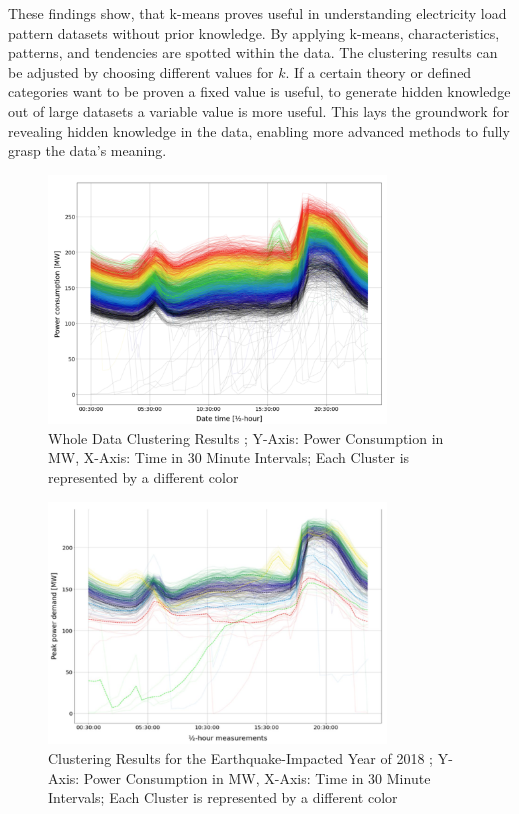 These findings show, that k-means proves useful in understanding electricity load pattern datasets without prior knowledge.
By applying k-means, characteristics, patterns, and tendencies are spotted within the data.
The clustering results can be adjusted by choosing different values for $k$.
If a certain theory or defined categories want to be proven a fixed value is useful, to generate hidden knowledge out of large datasets a variable value is more useful.
This lays the groundwork for revealing hidden knowledge in the data, enabling more advanced methods to fully grasp the data's meaning.

\begin{figure}[H]
    \centering
    \includegraphics[width=0.8\textwidth]{figures/jessen_ndImpactedClusters/jessen_wholeDataClustering.png}
    \caption{Whole Data Clustering Results \cite{JES-IND};
    Y-Axis: Power Consumption in MW, X-Axis: Time in 30 Minute Intervals;
    Each Cluster is represented by a different color}
    \label{fig:whole_data_clustering_results}
\end{figure}

\begin{figure}[H]
    \centering
    \includegraphics[width=0.8\textwidth]{figures/jessen_ndImpactedClusters/jessen_Clustering2018.png}
    \caption{Clustering Results for the Earthquake-Impacted Year of 2018 \cite{JES-IND};
    Y-Axis: Power Consumption in MW, X-Axis: Time in 30 Minute Intervals;
    Each Cluster is represented by a different color}
    \label{fig:clustering_results_2018}
\end{figure}


